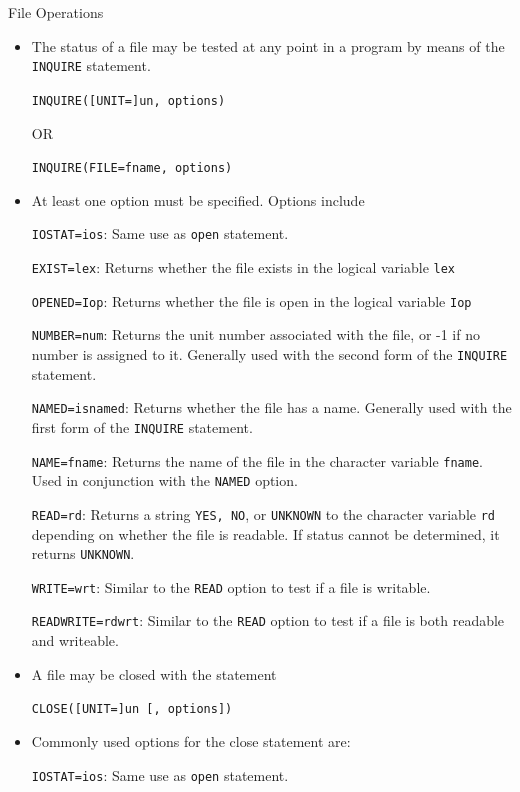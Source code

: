 \documentclass[c,mathserif,compress,xcolor=svgnames]{beamer}
\newcommand{\lstfortran}[1]{\lstinline[language={[90]Fortran},basicstyle=\footnotesize\ttfamily]|#1|}
\begin{document}
\begin{frame}{File Operations}
\begin{itemize}
      \framebreak
    \item The status of a file may be tested at any point in a program by means of the \lstfortran{INQUIRE} statement.
    \item[] \lstfortran{INQUIRE([UNIT=]un, options)}
    \item[OR]
    \item[] \lstfortran{INQUIRE(FILE=fname, options)}
    \item At least one option must be specified. Options include
    \item[] \lstfortran{IOSTAT=ios}: Same use as \lstfortran{open} statement.
    \item[] \lstfortran{EXIST=lex}: Returns whether the file exists in the logical variable \lstfortran{lex}
    \item[] \lstfortran{OPENED=Iop}: Returns whether the file is open in the logical variable \lstfortran{Iop}
    \item[] \lstfortran{NUMBER=num}: Returns the unit number associated with the file, or -1 if no number is assigned to it. Generally used with the second form of the \lstfortran{INQUIRE} statement.
    \item[] \lstfortran{NAMED=isnamed}: Returns whether the file has a name. Generally used with the first form of the \lstfortran{INQUIRE} statement.
    \item[] \lstfortran{NAME=fname}: Returns the name of the file in the character variable \lstfortran{fname}. Used in conjunction with the \lstfortran{NAMED} option.
    \item[] \lstfortran{READ=rd}: Returns a string \lstfortran{YES, NO}, or \lstfortran{UNKNOWN} to the character variable \lstfortran{rd} depending on whether the file is readable. If status cannot be determined, it returns \lstfortran{UNKNOWN}.
    \item[] \lstfortran{WRITE=wrt}: Similar to the \lstfortran{READ} option to test if a file is writable.
    \item[] \lstfortran{READWRITE=rdwrt}: Similar to the \lstfortran{READ} option to test if a file is both readable and writeable.
      \framebreak
    \item A file may be closed with the statement
    \item[]\lstfortran{CLOSE([UNIT=]un [, options])}
    \item Commonly used options for the close statement are:
    \item[] \lstfortran{IOSTAT=ios}: Same use as \lstfortran{open} statement.

\end{itemize}
\end{frame}
\end{document}
